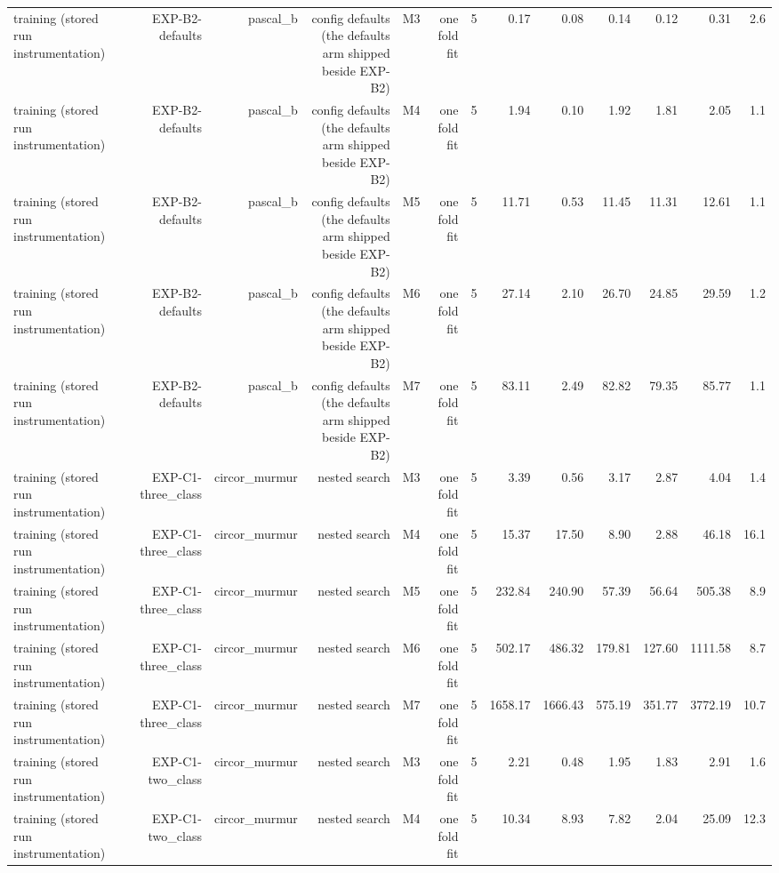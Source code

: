 \begin{table}[htbp]
\begin{tabular}{lrrrrrrrrrrrr}
    training (stored run instrumentation) & EXP-B2-defaults & pascal\_b & config defaults (the defaults arm shipped beside EXP-B2) & M3 & one fold fit & 5 & 0.17 & 0.08 & 0.14 & 0.12 & 0.31 & 2.6 \\
    training (stored run instrumentation) & EXP-B2-defaults & pascal\_b & config defaults (the defaults arm shipped beside EXP-B2) & M4 & one fold fit & 5 & 1.94 & 0.10 & 1.92 & 1.81 & 2.05 & 1.1 \\
    training (stored run instrumentation) & EXP-B2-defaults & pascal\_b & config defaults (the defaults arm shipped beside EXP-B2) & M5 & one fold fit & 5 & 11.71 & 0.53 & 11.45 & 11.31 & 12.61 & 1.1 \\
    training (stored run instrumentation) & EXP-B2-defaults & pascal\_b & config defaults (the defaults arm shipped beside EXP-B2) & M6 & one fold fit & 5 & 27.14 & 2.10 & 26.70 & 24.85 & 29.59 & 1.2 \\
    training (stored run instrumentation) & EXP-B2-defaults & pascal\_b & config defaults (the defaults arm shipped beside EXP-B2) & M7 & one fold fit & 5 & 83.11 & 2.49 & 82.82 & 79.35 & 85.77 & 1.1 \\
    training (stored run instrumentation) & EXP-C1-three\_class & circor\_murmur & nested search & M3 & one fold fit & 5 & 3.39 & 0.56 & 3.17 & 2.87 & 4.04 & 1.4 \\
    training (stored run instrumentation) & EXP-C1-three\_class & circor\_murmur & nested search & M4 & one fold fit & 5 & 15.37 & 17.50 & 8.90 & 2.88 & 46.18 & 16.1 \\
    training (stored run instrumentation) & EXP-C1-three\_class & circor\_murmur & nested search & M5 & one fold fit & 5 & 232.84 & 240.90 & 57.39 & 56.64 & 505.38 & 8.9 \\
    training (stored run instrumentation) & EXP-C1-three\_class & circor\_murmur & nested search & M6 & one fold fit & 5 & 502.17 & 486.32 & 179.81 & 127.60 & 1111.58 & 8.7 \\
    training (stored run instrumentation) & EXP-C1-three\_class & circor\_murmur & nested search & M7 & one fold fit & 5 & 1658.17 & 1666.43 & 575.19 & 351.77 & 3772.19 & 10.7 \\
    training (stored run instrumentation) & EXP-C1-two\_class & circor\_murmur & nested search & M3 & one fold fit & 5 & 2.21 & 0.48 & 1.95 & 1.83 & 2.91 & 1.6 \\
    training (stored run instrumentation) & EXP-C1-two\_class & circor\_murmur & nested search & M4 & one fold fit & 5 & 10.34 & 8.93 & 7.82 & 2.04 & 25.09 & 12.3 \\

\end{tabular}
\end{table}
